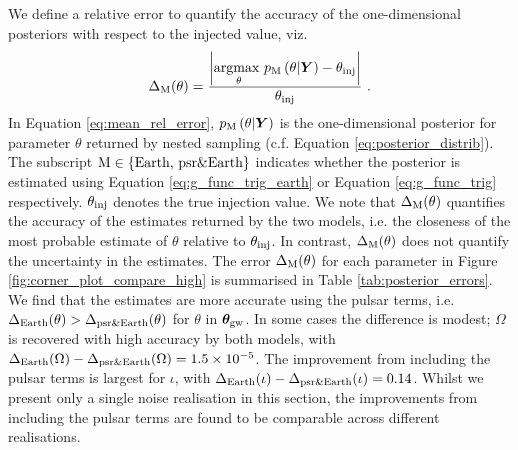 \documentclass[fleqn,usenatbib,useAMS]{mnras}
\begin{document}
We define a relative error to quantify the accuracy of the one-dimensional posteriors with respect to the injected value, viz.
\begin{eqnarray}
\Delta_{\rm M}(\theta) = \frac{ \left| \underset{\theta}{\text{argmax }} p_{\rm M}\left(\theta| \boldsymbol{Y}\right) - \theta_{\rm inj}\right|}{\theta_{\rm inj}} \ . \label{eq:mean_rel_error}
\end{eqnarray}
In Equation \eqref{eq:mean_rel_error}, $p_{\rm M}\left(\theta| \boldsymbol{Y}\right)$ is the one-dimensional posterior for parameter $\theta$ returned by nested sampling (c.f. Equation \eqref{eq:posterior_distrib}). The subscript $\rm M \in \{ \text{Earth, psr\&Earth} \}$ indicates whether the posterior is estimated using Equation \eqref{eq:g_func_trig_earth} or Equation \eqref{eq:g_func_trig} respectively. $\theta_{\rm inj}$ denotes the true injection value. We note that $\Delta_{\rm M}(\theta)$ quantifies the accuracy of the estimates returned by the two models, i.e. the closeness of the most probable estimate of $\theta$ relative to $\theta_{\rm inj}$. In contrast, $\Delta_{\rm M}(\theta)$ does not quantify the uncertainty in the estimates. The error $\Delta_{\rm M}(\theta)$ for each parameter in Figure \ref{fig:corner_plot_compare_high} is summarised in Table \ref{tab:posterior_errors}. We find that the estimates are more accurate using the pulsar terms, i.e. $\Delta_{\rm Earth}(\theta) > \Delta_{\rm psr \& Earth}(\theta)$ for $\theta$ in $\boldsymbol{\theta}_{\rm gw}$. In some cases the difference is modest;  $\Omega$ is recovered with high accuracy by both models, with $\Delta_{\rm Earth}(\Omega)-\Delta_{\rm psr \& Earth}(\Omega) = 1.5 \times 10^{-5}$. The improvement from including the pulsar terms is largest for $\iota$, with $\Delta_{\rm Earth}(\iota) - \Delta_{\rm psr \& Earth}(\iota)  = 0.14$. Whilst we present only a single noise realisation in this section, the improvements from including the pulsar terms are found to be comparable across different realisations. \newline 
\end{document}
